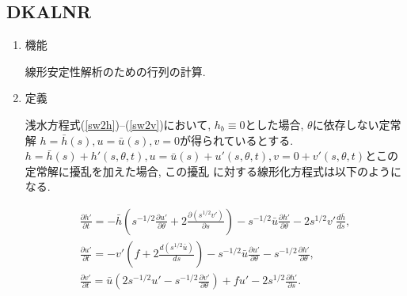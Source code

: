 \documentclass[a4j,fleqn]{jarticle}
\begin{document}

\subsection{DKALNR}

\begin{enumerate}

\item 機能

線形安定性解析のための行列の計算.

\item 定義

浅水方程式(\ref{sw2h})--(\ref{sw2v})において,
$h_b\equiv 0$とした場合, $\theta$に依存しない定常解
$h=\bar h(s), u=\bar u(s), v=0$が得られているとする.
$h=\bar h(s)+h'(s,\theta,t),
u=\bar u(s)+u'(s,\theta,t),
v=0+v'(s,\theta,t)$とこの定常解に擾乱を加えた場合, この擾乱
に対する線形化方程式は以下のようになる. 

\begin{gather}
\frac{\partial h'}{\partial t}
= 
-\bar h\left(s^{-1/2}\frac{\partial u'}{\partial\theta}
   +2\frac{\partial( s^{1/2}v')}{\partial s}\right)
   -s^{-1/2}\bar u\frac{\partial h'}{\partial\theta}
   -2s^{1/2}v'\frac{d\bar h}{ds},
   \\
\frac{\partial u'}{\partial t}
= -v'\left(f+2\frac{d(s^{1/2}\bar u)}{ds}\right)
   -s^{-1/2}\bar u\frac{\partial u'}{\partial\theta}
   -s^{-1/2}\frac{\partial h'}{\partial\theta},
   \\
\frac{\partial v'}{\partial t}
=\bar u\left(2s^{-1/2}u'-s^{-1/2}\frac{\partial v'}{\partial\theta}\right)
+fu'-2s^{1/2}\frac{\partial h'}{\partial s}.
\end{gather}


\end{enumerate}
\end{document}
